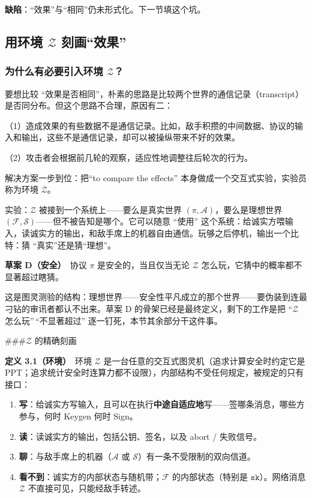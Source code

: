 \textbf{缺陷}：“效果”与“相同”仍未形式化。下一节填这个坑。

\subsection{\texorpdfstring{用环境 $\mathcal{Z}$ 刻画“效果”}{用环境\textbackslash mathcal\{Z\}刻画“效果”}}
\subsubsection{\texorpdfstring{为什么有必要引入环境 $\mathcal{Z}$？}{为什么有必要引入环境\textbackslash mathcal\{Z\}？}}

要想比较
“效果是否相同”，朴素的思路是比较两个世界的通信记录（transcript）是否同分布。但这个思路不合理，原因有二：

（1）造成效果的有些数据不是通信记录。比如，敌手积攒的中间数据、协议的输入和输出，这些不是通信记录，却可以被操纵带来不好的效果。

（2）攻击者会根据前几轮的观察，适应性地调整往后轮次的行为。

解决方案一步到位：把“to compare the effects”
本身做成一个交互式实验，实验员称为环境 $\mathcal{Z}$。

实验：$\mathcal{Z}$ 被接到一个系统上------要么是真实世界 $(\pi, \mathcal{A})$，要么是理想世界 $(\mathcal{F}, \mathcal{S})$------但不被告知是哪个。它可以随意
“使用”
这个系统：给诚实方喂输入，读诚实方的输出，和敌手席上的机器自由通信。玩够之后停机，输出一个比特：猜
“真实”还是猜“理想”。

\textbf{草案
D（安全）}　协议 $\pi$ 是安全的，当且仅当无论 $\mathcal{Z}$ 怎么玩，它猜中的概率都不显著超过瞎猜。

这是图灵测验的结构：理想世界------安全性平凡成立的那个世界------要伪装到连最刁钻的审讯者都认不出来。草案
D 的骨架已经是最终定义，剩下的工作是把
“$\mathcal{Z}$ 怎么玩”\,“不显著超过”
逐一钉死，本节其余部分干这件事。

\#\#\#$\mathcal{Z}$ 的精确刻画

\textbf{定义
3.1（环境）}　环境 $\mathcal{Z}$ 是一台任意的交互式图灵机（追求计算安全时约定它是
PPT；追求统计安全时连算力都不设限），内部结构不受任何规定，被规定的只有接口：

\begin{enumerate}
\def\labelenumi{\arabic{enumi}.}

\item
  \textbf{写}：给诚实方写输入，且可以在执行\textbf{中途自适应地}写------签哪条消息，哪些方参与，何时
  Keygen 何时 Sign。
\item
  \textbf{读}：读诚实方的输出，包括公钥、签名，以及 abort / 失败信号。
\item
  \textbf{聊}：与敌手席上的机器（$\mathcal{A}$ 或 $\mathcal{S}$）有一条不受限制的双向信道。
\item
  \textbf{看不到}：诚实方的内部状态与随机带；$\mathcal{F}$ 的内部状态（特别是 $\mathtt{sk}$）。网络消息 $\mathcal{Z}$ 不直接可见，只能经敌手转述。
\end{enumerate}


